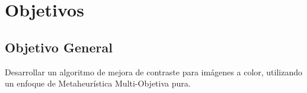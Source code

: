 


\section{Objetivos}
\subsection{Objetivo General}
Desarrollar un algoritmo de mejora de contraste para imágenes a color, utilizando un enfoque de Metaheurística Multi-Objetiva pura. 

